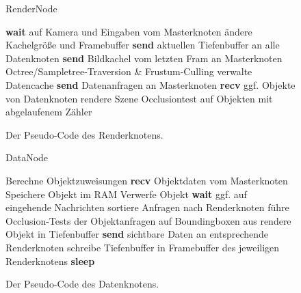 \begin{figure*}[ttt!]
\centering
 \begin{minipage}[t]{12cm}
\begin{algorithm}[H]
  \caption{RenderNode\label{fig:impl:rendernode}} 
    \begin{algorithmic} [1]
	\STATE \textbf{wait} auf Kamera und Eingaben vom Masterknoten
	  \STATE ändere Kachelgröße und Framebuffer
	  \STATE \textbf{send} aktuellen Tiefenbuffer an alle Datenknoten
	\ENDIF
	\STATE \textbf{send} Bildkachel vom letzten Fram an Masterknoten
	\STATE Octree/Sampletree-Traversion \& Frustum-Culling
	\STATE verwalte Datencache
	\STATE \textbf{send} Datenanfragen an Masterknoten
	\STATE \textbf{recv} ggf. Objekte von Datenknoten
	\STATE rendere Szene
	\STATE Occlusiontest auf Objekten mit abgelaufenem Zähler
      \ENDWHILE
    \end{algorithmic}
\end{algorithm}
 \end{minipage}
\caption{Der Pseudo-Code des Renderknotens.}
\end{figure*}

\begin{figure*}[ttt!]
\centering
 \begin{minipage}[t]{12cm}
\begin{algorithm}[H]
  \caption{DataNode\label{fig:impl:datanode}} 
    \begin{algorithmic} [1]
      \STATE Berechne Objektzuweisungen
      \STATE \textbf{recv} Objektdaten vom Masterknoten
	\STATE Speichere Objekt im RAM
      \ELSE
	\STATE Verwerfe Objekt
      \ENDIF
	\STATE \textbf{wait} ggf. auf eingehende Nachrichten
	  \STATE sortiere Anfragen nach Renderknoten
	    \STATE führe Occlusion-Tests der Objektanfragen auf Boundingboxen aus
	  \ENDFOR
	    \STATE rendere Objekt in Tiefenbuffer
 	  \ENDFOR
	  \STATE \textbf{send} sichtbare Daten an entsprechende Renderknoten
	  \STATE schreibe Tiefenbuffer in Framebuffer des jeweiligen Renderknotens
	\ELSE \STATE\textbf{sleep}
	\ENDIF
      \ENDWHILE
    \end{algorithmic}
\end{algorithm}
 \end{minipage}
\caption{Der Pseudo-Code des Datenknotens.}
\end{figure*}

